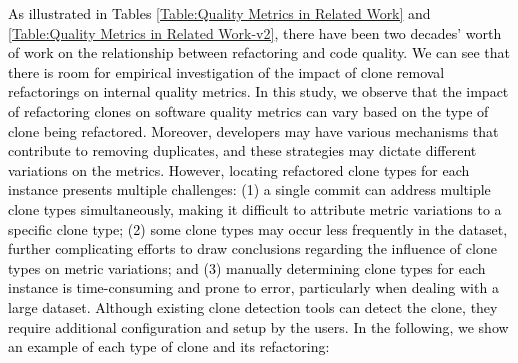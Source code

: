 
\noindent{\textbf{ \textcolor{black}{Lesson 2: Refactoring different types of clones can have different variations on metric values.}}}  \textcolor{black}{As illustrated in \textcolor{black}{Tables \ref{Table:Quality Metrics in Related Work} and \ref{Table:Quality Metrics in Related Work-v2}}, there have been two decades' worth of work on the relationship between refactoring and code quality. We can see that there is room for empirical investigation of the impact of clone removal refactorings on internal quality metrics. In this study, we observe that the impact of refactoring clones on software quality metrics can vary based on the type of clone being refactored. Moreover, developers may have various mechanisms that contribute to removing duplicates, and these strategies may dictate different variations on the metrics. However, locating refactored clone types for each instance presents multiple challenges: (1) a single commit can address multiple clone types simultaneously, making it difficult to attribute metric variations to a specific clone type;  (2) some clone types may occur less frequently in the dataset, further complicating efforts to draw conclusions regarding the influence of clone types on metric variations; and (3) manually determining clone types for each instance is time-consuming and prone to error, particularly when dealing with a large dataset. Although existing clone detection tools can detect the clone, they require additional configuration and setup by the users. In the following, we show an example of each type of clone and its refactoring:}
